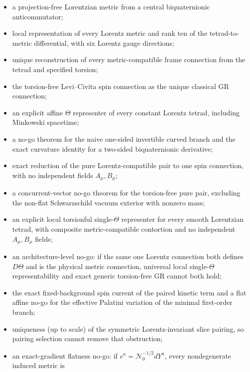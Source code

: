 \documentclass[12pt,a4paper]{article}
\theoremstyle{remark}\newtheorem{remark}[definition]{Remark}
\begin{document}
\begin{tcolorbox}[breakable,colback=green!5!white,colframe=green!60!black,title=Proved in this draft]
\begin{itemize}
 \item a projection-free Lorentzian metric from a central biquaternionic
       anticommutator;
 \item local representation of every Lorentz metric and rank ten of the
       tetrad-to-metric differential, with six Lorentz gauge directions;
 \item unique reconstruction of every metric-compatible frame connection from
       the tetrad and specified torsion;
 \item the torsion-free Levi--Civita spin connection as the unique classical GR
       connection;
 \item an explicit affine $\Theta$ representer of every constant Lorentz tetrad,
       including Minkowski spacetime;
 \item a no-go theorem for the naive one-sided invertible curved branch and the
       exact curvature identity for a two-sided biquaternionic derivative;
 \item exact reduction of the pure Lorentz-compatible pair to one spin
       connection, with no independent fields $A_\mu,B_\mu$;
 \item a concurrent-vector no-go theorem for the torsion-free pure pair,
       excluding the non-flat Schwarzschild vacuum exterior with nonzero mass;
 \item an explicit local torsionful single-$\Theta$ representer for every
       smooth Lorentzian tetrad, with composite metric-compatible contortion
       and no independent $A_\mu,B_\mu$ fields;
 \item an architecture-level no-go: if the same one Lorentz connection both
       defines $D\Theta$ and is the physical metric connection, universal local
       single-$\Theta$ representability and exact generic torsion-free GR cannot
       both hold;
 \item the exact fixed-background spin current of the paired kinetic term and
       a flat affine no-go for the effective Palatini variation of the minimal
       first-order branch;
 \item uniqueness (up to scale) of the symmetric Lorentz-invariant slice
       pairing, so pairing selection cannot remove that obstruction;
 \item an exact-gradient flatness no-go: if
       $e^a=\mathcal N_0^{-1/2}dY^a$, every nondegenerate induced metric is

\end{itemize}
\end{tcolorbox}
\end{document}
